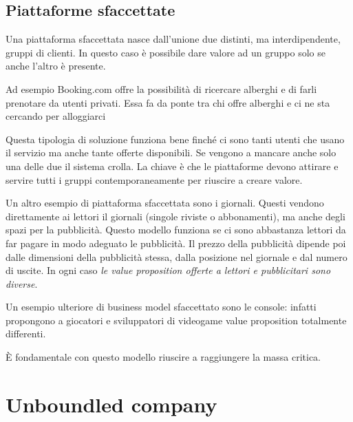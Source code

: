 \section{Piattaforme sfaccettate}

Una piattaforma sfaccettata nasce dall'unione due distinti, ma interdipendente,
gruppi di clienti. In questo caso è possibile dare valore ad un gruppo solo se
anche l'altro è presente.

\begin{example}
Ad esempio Booking.com offre la possibilità di ricercare alberghi e di farli
prenotare da utenti privati. Essa fa da ponte tra chi offre alberghi e ci ne
sta cercando per alloggiarci
\end{example}

Questa tipologia di soluzione funziona bene finché ci sono tanti utenti che
usano il servizio ma anche tante offerte disponibili. Se vengono a mancare
anche solo una delle due il sistema crolla. La chiave è che le piattaforme
devono attirare e servire tutti i gruppi contemporaneamente per riuscire a
creare valore.

\begin{example}[Pubblicità]
Un altro esempio di piattaforma sfaccettata sono i giornali. Questi vendono
direttamente ai lettori il giornali (singole riviste o abbonamenti), ma anche
degli spazi per la pubblicità. Questo modello funziona se ci sono abbastanza
lettori da far pagare in modo adeguato le pubblicità. Il prezzo della pubblicità
dipende poi dalle dimensioni della pubblicità stessa, dalla posizione nel
giornale e dal numero di uscite. In ogni caso \emph{le value proposition offerte
a lettori e pubblicitari sono diverse}.
\end{example}

\begin{example}
Un esempio ulteriore di business model sfaccettato sono le console: infatti
propongono a giocatori e sviluppatori di videogame value proposition totalmente
differenti.
\end{example}


È fondamentale con questo modello riuscire a raggiungere la massa critica.

\chapter{Unboundled company}

